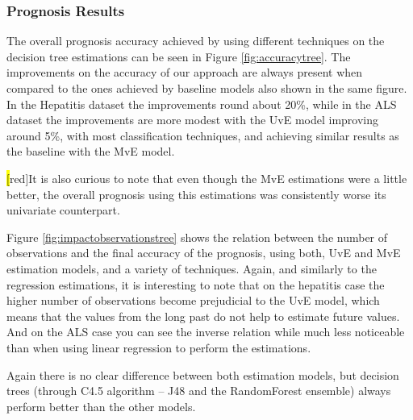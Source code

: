 \subsubsection{Prognosis Results}
\label{subsubsection:prognosis_dt}

The overall prognosis accuracy achieved by using different techniques on the decision tree estimations can be seen in Figure \ref{fig:accuracytree}.
The improvements on the accuracy of our approach are always present when compared to the ones achieved by baseline models also shown in the same figure. In the Hepatitis dataset the improvements round about 20\%, while in the ALS dataset the improvements are more modest with the UvE model improving around 5\%, with most classification techniques, and achieving similar results as the baseline with the MvE model.

\hl[red]{It is also curious to note that even though the MvE estimations were a little better, the overall prognosis using this estimations was consistently worse its univariate counterpart.}

Figure \ref{fig:impactobservationstree} shows the relation between the number of observations and the final accuracy of the prognosis, using both, UvE and MvE estimation models, and a variety of techniques. Again, and similarly to the regression estimations, it is interesting to note that on the hepatitis case the higher number of observations become prejudicial to the UvE model, which means that the values from the long past do not help to estimate future values. And on the ALS case you can see the inverse relation while much less noticeable than when using linear regression to perform the estimations.

Again there is no clear difference between both estimation models, but decision trees (through C4.5 algorithm – J48 and the RandomForest ensemble) always perform better than the other models. 

